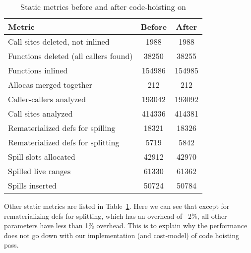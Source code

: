 \documentclass{sig-alternate}
\begin{document}
\begin{table}[h!]
  \begin{center}
    \begin{tabular}{|l|c|c|}
      \hline
      Metric               & Before & After              \\\hline
      Call sites deleted, not inlined             & 1988    & 1988   \\\hline
      Functions deleted (all callers found)       & 38250   & 38255  \\\hline
      Functions inlined                           & 154986  & 154985 \\\hline
      Allocas merged together                     & 212     & 212    \\\hline
      Caller-callers analyzed                     & 193042  & 193092 \\\hline
      Call sites analyzed                         & 414336  & 414381 \\\hline
      Rematerialized defs for spilling            & 18321   & 18326  \\\hline
      Rematerialized defs for splitting           & 5719    & 5842   \\\hline
      Spill slots allocated                       & 42912   & 42970  \\\hline
      Spilled live ranges                         & 61330   & 61362  \\\hline
      Spills inserted                             & 50724   & 50784  \\\hline
\end{tabular}
  \end{center}
  \caption{Static metrics before and after code-hoisting on \LLVMTestSuite{}}
  \label{tab:static-results}
\end{table}


Other static metrics are listed in Table~\ref{tab:static-results}. Here we can
see that except for rematerializing defs for splitting, which has an overhead of ~2\%, all
other parameters have less than 1\% overhead. This is to explain why the performance does not
go down with our implementation (and cost-model) of code hoisting pass.
\end{document}
